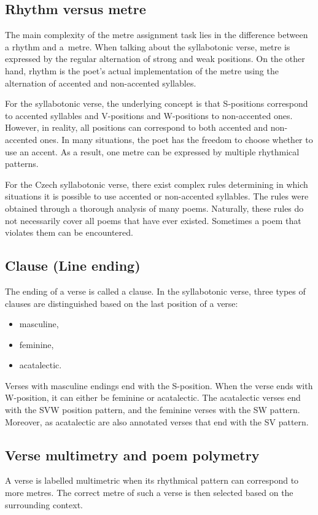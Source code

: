 \subsection{Rhythm versus metre}
The main complexity of the metre assignment task lies in the difference between a rhythm and a~metre. When talking about the syllabotonic verse, metre is expressed by the regular alternation of strong and weak positions. On the other hand, rhythm is the poet's actual implementation of the metre using the alternation of accented and non-accented syllables.

For the syllabotonic verse, the underlying concept is that S-positions correspond to accented syllables and V-positions and W-positions to non-accented ones. However, in reality, all positions can correspond to both accented and non-accented ones. In many situations, the poet has the freedom to choose whether to use an accent. As a result, one metre can be expressed by multiple rhythmical patterns.

For the Czech syllabotonic verse, there exist complex rules determining in which situations it is possible to use accented or non-accented syllables. The rules were obtained through a thorough analysis of many poems. Naturally, these rules do not necessarily cover all poems that have ever existed. Sometimes a poem that violates them can be encountered.~\cite{UvodTeorieVerse}

\subsection{Clause (Line ending)}
The ending of a verse is called a clause. In the syllabotonic verse, three types of clauses are distinguished based on the last position of a verse:
\begin{itemize}
\item masculine,
\item feminine,
\item acatalectic.
\end{itemize}

Verses with masculine endings end with the S-position. When the verse ends with W-position, it can either be feminine or acatalectic. The acatalectic verses end with the SVW position pattern, and the feminine verses with the SW pattern.~\cite{UvodTeorieVerse} Moreover, as acatalectic are also annotated verses that end with the SV pattern.~\cite{GitCorpusCzechVerse}

\subsection{Verse multimetry and poem polymetry}
A verse is labelled multimetric when its rhythmical pattern can correspond to more metres. The correct metre of such a verse is then selected based on the surrounding context.

